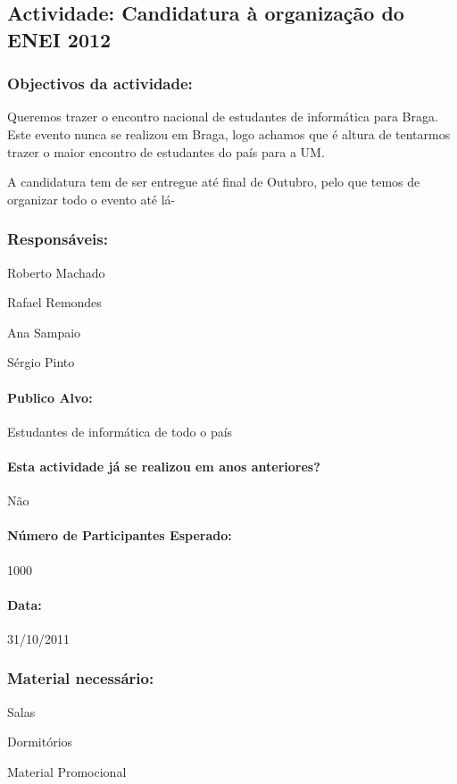 \subsection{Actividade:  Candidatura à organização do ENEI  2012} %

\subsubsection*{Objectivos da actividade:}
Queremos trazer o encontro nacional de estudantes de informática para Braga. Este evento nunca se realizou em Braga, logo achamos que é altura de tentarmos trazer o maior encontro de estudantes do país para a UM.

A candidatura tem de ser entregue até final de Outubro, pelo que temos de organizar todo o evento até lá-

\subsubsection*{Responsáveis:}
\begin{itemizedash}
	\item{Roberto Machado}
	\item{Rafael Remondes}
	\item{Ana Sampaio}
	\item{Sérgio Pinto}
\end{itemizedash}

\paragraph{Publico Alvo: }
Estudantes de informática de todo o país

\paragraph{Esta actividade já se realizou em anos anteriores?}
Não

\paragraph{Número de Participantes Esperado:}
1000

\paragraph{Data:} 31/10/2011

\subsubsection*{Material necessário:}
\begin{itemizedash}
	\item{Salas}
	\item{Dormitórios}
	\item{Material Promocional}
\end{itemizedash}

